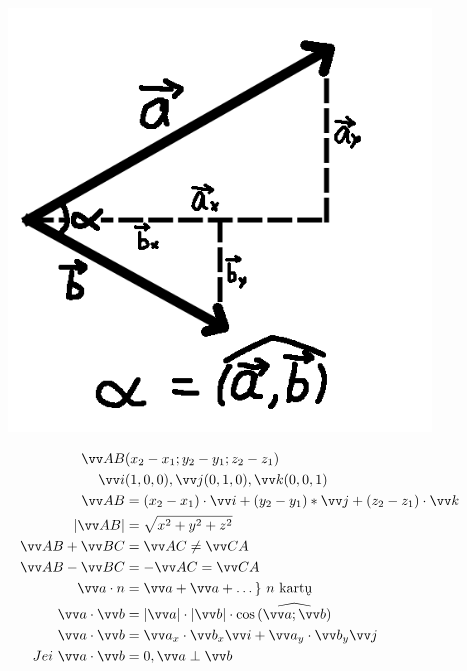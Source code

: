 \documentclass[fleqn]{article} %
\begin{document}
\begin{figure}
\includegraphics[scale=0.4]{vector_basics.png}
\end{figure}

\begin{equation}
    \hspace{10mm}
    \begin{aligned}
        \vec{AB} & (x_2 - x_1; y_2 - y_1; z_2 - z_1) \\
        \vec{i} & (1, 0, 0), \vec{j}(0, 1, 0), \vec{k}(0, 0, 1) \\
        \vec{AB} &= (x_2 - x_1) \cdot \vec{i} + (y_2 - y_1) * \vec{j} + (z_2 - z_1) \cdot \vec{k} \\
        |\vec{AB}| &= \sqrt{x^2 + y^2 + z^2} \\
        \vec{AB} + \vec{BC} &= \vec{AC} \ne \vec{CA} \\
        \vec{AB} - \vec{BC} &= -\vec{AC} = \vec{CA} \\
        \vec{a} \cdot n &= \vec{a} + \vec{a} + \dots \}\ n \text{ kartų} \\
        \vec{a} \cdot \vec{b} &= |\vec{a}| \cdot |\vec{b}| \cdot \cos{\widehat{(\vec{a}; \vec{b})}} \\
        \vec{a} \cdot \vec{b} &= \vec{a}_x \cdot \vec{b}_x \vec{i} + \vec{a}_y \cdot \vec{b}_y \vec{j} \\
        Jei\ \vec{a} \cdot \vec{b} &= 0, \vec{a} \perp \vec{b}
    \end{aligned}
\end{equation}
\end{document}
